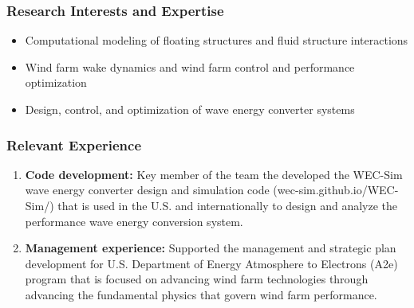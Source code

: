\subsubsection*{Research Interests and Expertise}
\vspace{-0.15in}

\begin{itemize}  \itemsep1pt \parskip0pt 
\item Computational modeling of floating structures and fluid structure interactions
\item Wind farm wake dynamics and wind farm control and performance optimization
\item Design, control, and optimization of wave energy converter systems
\end{itemize}

\vspace{-0.2in}
\subsubsection*{Relevant Experience}
\vspace{-0.1in}
\begin{enumerate}[leftmargin=1.5pc,itemsep=2pt,parsep=0pt,topsep=0pt,partopsep=1pt]
\item \textbf{Code development:} Key member of the team the developed the WEC-Sim wave energy converter design and simulation code (wec-sim.github.io/WEC-Sim/) that is used in the U.S. and internationally to design and analyze the performance wave energy conversion system.
\item \textbf{Management experience:} Supported the management and strategic plan development for U.S. Department of Energy Atmosphere to Electrons (A2e) program that is focused on advancing wind farm technologies through advancing the fundamental physics that govern wind farm performance.
\end{enumerate}
